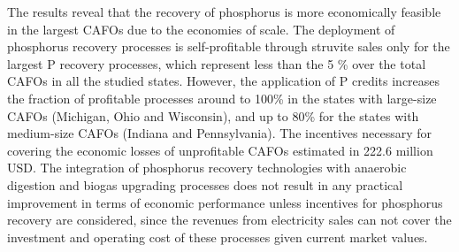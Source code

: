 \begin{refsection}[referencesCh5]
The results reveal that the recovery of phosphorus is more economically feasible in the largest CAFOs due to the economies of scale. The deployment of phosphorus recovery processes is self-profitable through struvite sales only for the largest P recovery processes, which represent less than the 5 \% over the total CAFOs in all the studied states. However, the application of P credits increases the fraction of profitable processes around to 100\% in the states with large-size CAFOs (Michigan, Ohio and Wisconsin), and up to 80\% for the states with medium-size CAFOs (Indiana and Pennsylvania).
The incentives necessary for covering the economic losses of unprofitable CAFOs estimated in 222.6 million USD.
The integration of phosphorus recovery technologies with anaerobic digestion and biogas upgrading processes does not result in any practical improvement in terms of economic performance unless incentives for phosphorus recovery are considered, since the revenues from electricity sales can not cover the investment and operating cost of these processes given current market values.


\end{refsection}
